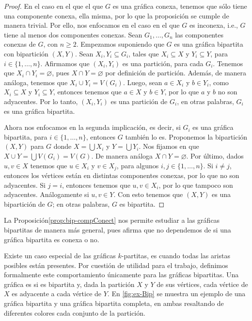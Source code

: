 \begin{proof}
    En el caso en el que el que $G$ es una gr\'afica conexa, tenemos que s\'olo
    tiene una componente conexa, ella misma, por lo que la proposici\'on se
    cumple de manera trivial. Por ello, nos enfocamos en el caso en el que $G$
    es inconexa, i.e., $G$ tiene al menos dos componentes conexas. Sean $G_1,
    \dots, G_n$ las componentes conexas de $G$, con $n \geq 2$. Empezamos
    suponiendo que $G$ es una gr\'afica bipartita con bipartici\'on $(X,Y)$.
    Sean $X_i, Y_i\subseteq G_i$, tales que $X_i \subseteq X$ y $Y_i \subseteq
    Y$, para $i \in \{1, \dots, n\}$. Afirmamos que $(X_i,Y_i)$ es una
    partici\'on, para cada $G_i$. Tenemos que $X_i \cap Y_i = \varnothing$, pues
    $X \cap Y = \varnothing$ por definici\'on de partici\'on. Adem\'as, de
    manera an\'aloga, tenemos que $X_i \cup Y_i = V(G_i)$.  Luego, sean $a \in
    X_i$ y $b \in Y_i$, como $X_i \subseteq X$ y $Y_i \subseteq Y$, entonces
    tenemos que $a \in X$ y $b \in Y$, por lo que $a$ y $b$ no son adyacentes.
    Por lo tanto, $(X_i, Y_i)$ es una partici\'on de $G_i$, en otras palabras,
    $G_i$ es una gr\'afica bipartita.

    Ahora nos enfocamos en la segunda implicaci\'on, es decir, si $G_i$ es una
    gr\'afica bipartita, para $i \in \{1, \dots, n\}$, entonces $G$ tambi\'en lo
    es. Proponemos la bipartici\'on $(X,Y)$ para $G$ donde $X = \bigcup X_i$ y
    $Y =\bigcup Y_i$. Nos fijamos en que $X \cup Y = \bigcup V(G_i)=V(G)$. De
    manera an\'aloga $X \cap Y = \varnothing$. Por \'ultimo, dados $u,v \in X$
    tenemos que $u \in X_i$ y $v \in X_j$, para algunos $i,j \in \{1,
    \dots,n\}$. Si $i \neq j$, entonces los v\'ertices est\'an en distintas
    componentes conexas, por lo que no son adyacentes. Si $j=i$, entonces
    tenemos que $u,v \in X_i$, por lo que tampoco son adyacentes. An\'alogamente
    si $u,v \in Y$. Con esto tenemos que $(X,Y)$ es una bipartici\'on de $G$; en
    otras palabras, $G$ es bipartita.
\end{proof}

La Proposici\'on\ref{prop:bip-compConect} nos permite estudiar a las gr\'aficas
bipartitas de manera m\'as general, pues afirma que no dependemos de si una
gr\'afica bipartita es conexa o no.


Existe un caso especial de las gr\'aficas
$k$-partitas, es cuando todas las aristas posibles est\'an presentes. Por
cuesti\'on de utilidad para el trabajo, definimos formalmente este
comportamiento \'unicamente para las gr\'aficas bipartitas. Una gr\'afica es
 si es
bipartita y, dada la partici\'on $X$ y $Y$ de sus v\'ertices, cada v\'ertice de
$X$ es adyacente a cada v\'ertice de $Y$. En \cref{fig:ex-Bip} se muestra un
ejemplo de una gr\'afica bipartita y una gr\'afica bipartita completa, en ambas
resaltando de diferentes colores cada conjunto de la partici\'on. 

